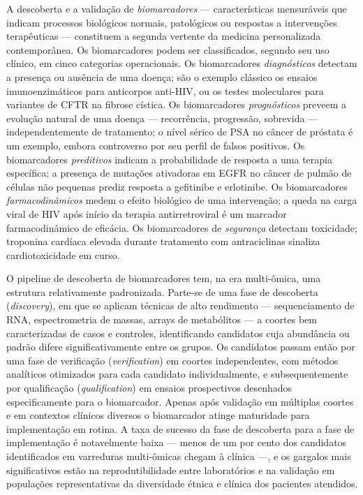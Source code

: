 A descoberta e a validação de \emph{biomarcadores} --- características mensuráveis que indicam processos biológicos normais, patológicos ou respostas a intervenções terapêuticas --- constituem a segunda vertente da medicina personalizada contemporânea. Os biomarcadores podem ser classificados, segundo seu uso clínico, em cinco categorias operacionais. Os biomarcadores \emph{diagnósticos} detectam a presença ou ausência de uma doença; são o exemplo clássico os ensaios imunoenzimáticos para anticorpos anti-HIV, ou os testes moleculares para variantes de CFTR na fibrose cística. Os biomarcadores \emph{prognósticos} preveem a evolução natural de uma doença --- recorrência, progressão, sobrevida --- independentemente de tratamento; o nível sérico de PSA no câncer de próstata é um exemplo, embora controverso por seu perfil de falsos positivos. Os biomarcadores \emph{preditivos} indicam a probabilidade de resposta a uma terapia específica; a presença de mutações ativadoras em EGFR no câncer de pulmão de células não pequenas prediz resposta a gefitinibe e erlotinibe. Os biomarcadores \emph{farmacodinâmicos} medem o efeito biológico de uma intervenção; a queda na carga viral de HIV após início da terapia antirretroviral é um marcador farmacodinâmico de eficácia. Os biomarcadores de \emph{segurança} detectam toxicidade; troponina cardíaca elevada durante tratamento com antraciclinas sinaliza cardiotoxicidade em curso.

O pipeline de descoberta de biomarcadores tem, na era multi-ômica, uma estrutura relativamente padronizada. Parte-se de uma fase de descoberta (\emph{discovery}), em que se aplicam técnicas de alto rendimento --- sequenciamento de RNA, espectrometria de massas, arrays de metabólitos --- a coortes bem caracterizadas de casos e controles, identificando candidatos cuja abundância ou padrão difere significativamente entre os grupos. Os candidatos passam então por uma fase de verificação (\emph{verification}) em coortes independentes, com métodos analíticos otimizados para cada candidato individualmente, e subsequentemente por qualificação (\emph{qualification}) em ensaios prospectivos desenhados especificamente para o biomarcador. Apenas após validação em múltiplas coortes e em contextos clínicos diversos o biomarcador atinge maturidade para implementação em rotina. A taxa de sucesso da fase de descoberta para a fase de implementação é notavelmente baixa --- menos de um por cento dos candidatos identificados em varreduras multi-ômicas chegam à clínica ---, e os gargalos mais significativos estão na reprodutibilidade entre laboratórios e na validação em populações representativas da diversidade étnica e clínica dos pacientes atendidos.

